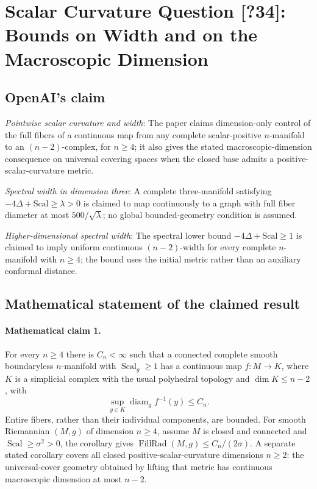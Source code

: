 \documentclass[11pt]{article}
\begin{document}
\section*{Scalar Curvature Question [?34]: Bounds on Width and on the Macroscopic Dimension}

\subsection{OpenAI's claim}
\textit{Pointwise scalar curvature and width}: The paper claims dimension-only control of the full fibers of a continuous map from any complete scalar-positive $n$-manifold to an $(n-2)$-complex, for $n\ge4$; it also gives the stated macroscopic-dimension consequence on universal covering spaces when the closed base admits a positive-scalar-curvature metric.

\textit{Spectral width in dimension three}: A complete three-manifold satisfying $-4\Delta+\mathrm{Scal}\ge\lambda>0$ is claimed to map continuously to a graph with full fiber diameter at most $500/\sqrt\lambda$; no global bounded-geometry condition is assumed.

\textit{Higher-dimensional spectral width}: The spectral lower bound $-4\Delta+\mathrm{Scal}\ge1$ is claimed to imply uniform continuous $(n-2)$-width for every complete $n$-manifold with $n\ge4$; the bound uses the initial metric rather than an auxiliary conformal distance.

\subsection{Mathematical statement of the claimed result}
\paragraph{Mathematical claim 1.} For every $n\ge4$ there is $C_n<\infty$ such that a connected complete smooth boundaryless $n$-manifold with $\operatorname{Scal}_g\ge1$ has a continuous map $f:M\to K$, where $K$ is a simplicial complex with the usual polyhedral topology and $\dim K\le n-2$, with \[\sup_{y\in K}\operatorname{diam}_g f^{-1}(y)\le C_n.\] Entire fibers, rather than their individual components, are bounded. For smooth Riemannian $(M,g)$ of dimension $n\ge4$, assume $M$ is closed and connected and $\operatorname{Scal}\ge\sigma^2>0$, the corollary gives $\operatorname{FillRad}(M,g)\le C_n/(2\sigma)$. A separate stated corollary covers all closed positive-scalar-curvature dimensions $n\ge2$: the universal-cover geometry obtained by lifting that metric has continuous macroscopic dimension at most $n-2$.
\end{document}
